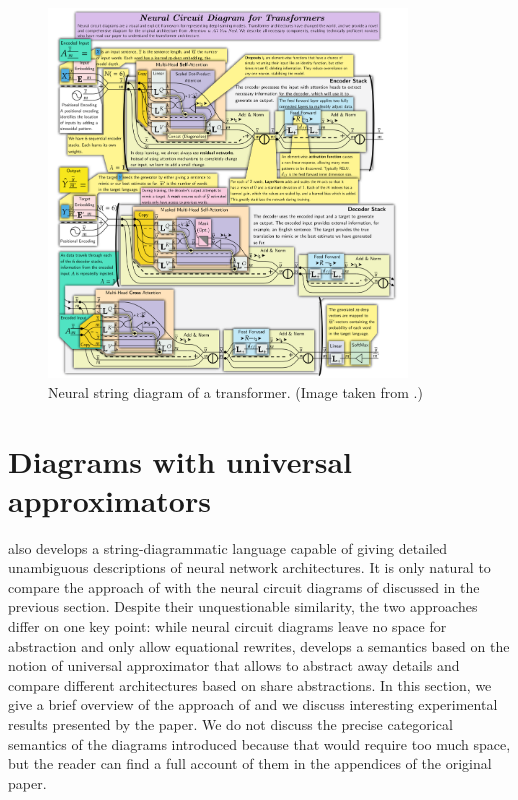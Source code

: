 \documentclass[11pt,a4paper,openright,twoside]{report}
\theoremstyle{plain}
\theoremstyle{definition}
\begin{document}
\begin{figure}[h]
  \begin{center}
    \includegraphics[width=0.85\textwidth]{figures/transformer_ncd.png}     
    \caption[Neural string diagram of a transformer]{Neural string diagram of a transformer. (Image taken from \cite{abbott2023robust}.)}
    \label{fig: transformerncd}
  \end{center}
\end{figure}



\section{Diagrams with universal approximators}

\cite{khatri2024anatomy} also develops a string-diagrammatic language capable of giving detailed unambiguous descriptions of neural network architectures. It is only natural to compare the approach of \cite{khatri2024anatomy} with the neural circuit diagrams of \cite{abbott2023robust} discussed in the previous section. Despite their unquestionable similarity, the two approaches differ on one key point: while neural circuit diagrams leave no space for abstraction and only allow equational rewrites, \cite{khatri2024anatomy} develops a semantics based on the notion of universal approximator that allows to abstract away details and compare different architectures based on share abstractions. In this section, we give a brief overview of the approach of \cite{khatri2024anatomy} and we discuss interesting experimental results presented by the paper. We do not discuss the precise categorical semantics of the diagrams introduced \cite{khatri2024anatomy} because that would require too much space, but the reader can find a full account of them in the appendices of the original paper. 
\end{document}
